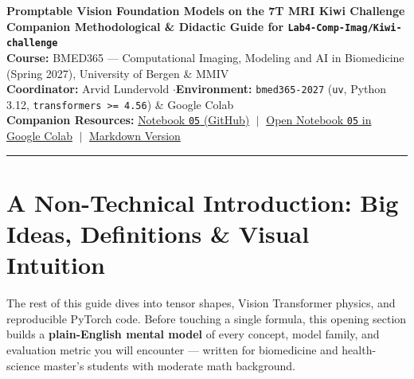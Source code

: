 \documentclass[10.5pt,a4paper]{article}
\begin{document}
\begin{tcolorbox}[enhanced, colback=uibblue!6, colframe=uibblue, boxrule=1.0pt, arc=3pt, left=10pt, right=10pt, top=9pt, bottom=9pt]
{\LARGE\bfseries\color{uibblue} Promptable Vision Foundation Models on the 7T MRI Kiwi Challenge}\\[4pt]
{\normalsize\bfseries Companion Methodological \& Didactic Guide for \texttt{Lab4-Comp-Imag/Kiwi-challenge}}\\[3pt]
{\small \textbf{Course:} BMED365 --- Computational Imaging, Modeling and AI in Biomedicine (Spring 2027), University of Bergen \& MMIV\\
\textbf{Coordinator:} Arvid Lundervold \quad$\cdot$\quad \textbf{Environment:} \texttt{bmed365-2027} (\texttt{uv}, Python 3.12, \texttt{transformers >= 4.56}) \& Google Colab\\[3pt]
\textbf{Companion Resources:} \href{https://github.com/arvidl/BMED365-2027/blob/main/Lab4-Comp-Imag/Kiwi-challenge/notebooks/05-kiwi-promptable-foundation-models.ipynb}{Notebook \texttt{05} (GitHub)} $\;\vert\;$ \href{https://colab.research.google.com/github/arvidl/BMED365-2027/blob/main/Lab4-Comp-Imag/Kiwi-challenge/notebooks/05-kiwi-promptable-foundation-models.ipynb}{Open Notebook \texttt{05} in Google Colab} $\;\vert\;$ \href{https://github.com/arvidl/BMED365-2027/blob/main/Lab4-Comp-Imag/Kiwi-challenge/docs/promptable-foundation-models.md}{Markdown Version}}
\end{tcolorbox}

\vspace{-2pt}
{\small\tableofcontents}
\vspace{4pt}
\hrule
\vspace{6pt}

\section{A Non-Technical Introduction: Big Ideas, Definitions \& Visual Intuition}

\begin{infobox}
The rest of this guide dives into tensor shapes, Vision Transformer physics, and reproducible PyTorch code. Before touching a single formula, this opening section builds a \textbf{plain-English mental model} of every concept, model family, and evaluation metric you will encounter --- written for biomedicine and health-science master's students with moderate math background.
\end{infobox}
\end{document}
